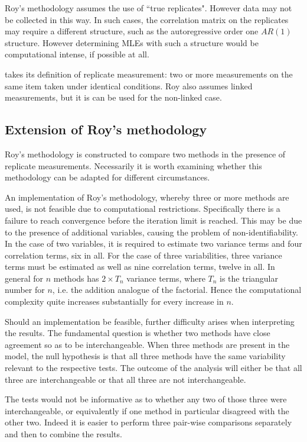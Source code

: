 \documentclass[12pt, a4paper]{report}
\theoremstyle{plain}
\theoremstyle{definition}
\theoremstyle{remark}
\begin{document}
	Roy's methodology assumes the use of ``true replicates". However data may not be collected in this way. In such cases, the correlation matrix on the replicates may require a different structure, such as the autoregressive order one $AR(1)$ structure. However determining MLEs with such a structure would be computational intense, if possible at all.
	
	
	\citet{ARoy2009} takes its definition of replicate measurement: two or more measurements on the same item taken
	under identical conditions. Roy also assumes linked measurements, but it is can be used for the non-linked case.
	
	
	\subsection{Extension of Roy's methodology}
	Roy's methodology is constructed to compare two methods in the presence of replicate measurements. Necessarily it is worth examining whether this methodology can be adapted for different circumstances.
	
	An implementation of Roy's methodology, whereby three or more methods are used, is not feasible due to computational restrictions. Specifically there is a failure to reach convergence before the iteration limit is reached. This may be due to the presence of additional variables, causing the problem of non-identifiability. In the case of two variables, it is required to estimate two variance terms and four correlation terms, six in all. For the case of three variabilities, three variance terms must be estimated as well as nine correlation terms, twelve in all. In general for $n$ methods has $2 \times T_{n}$ variance terms, where $T_n$ is the triangular number for $n$, i.e. the addition analogue of the factorial. Hence the computational complexity quite increases substantially for every increase in $n$.
	
	Should an implementation be feasible, further difficulty arises when interpreting the results. The fundamental question is whether two methods have close agreement so as to be interchangeable. When three methods are present in the model, the null hypothesis is that all three methods have the same variability relevant to the respective tests. The outcome of the analysis will either be that all three are interchangeable or that all three are not interchangeable.
	
	The tests would not be informative as to whether any two of those three were interchangeable, or equivalently if one method in particular disagreed with the other two. Indeed it is easier to perform three pair-wise comparisons separately and then to combine the results.
	
\end{document}
